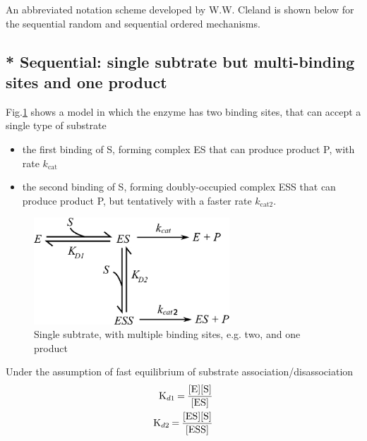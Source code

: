 An abbreviated notation  scheme developed by W.W. Cleland is shown below for the
sequential random and sequential ordered mechanisms.  

\subsection{* Sequential: single subtrate but multi-binding sites and one
product}

Fig.\ref{fig:single-substrate-multi-bindingsite_single-product} shows a model in
which the enzyme has two binding sites, that can accept a single type of
substrate
\begin{itemize}
  \item the first binding of S, forming complex ES that can produce product P,
  with rate $k_\text{cat}$
  
  \item the second binding of S, forming doubly-occupied complex ESS that can
  produce product P, but tentatively with a faster rate $k_\text{cat2}$.
\end{itemize}

 \begin{figure}[htb]
  \centerline{\includegraphics[height=4cm]{./images/single-substrate-multi-bindingsite_single-product.eps}}
  \caption{Single
  subtrate, with
  multiple binding
  sites, e.g. two,
  and one product}\label{fig:single-substrate-multi-bindingsite_single-product}
\end{figure}

Under the assumption of fast equilibrium of substrate
association/disassociation
\begin{equation}
\begin{split}
\ce{K_{d1} = \frac{[E][S]}{[ES]} } \\
\ce{K_{d2} = \frac{[ES][S]}{[ESS]} }
\end{split}
\end{equation}

